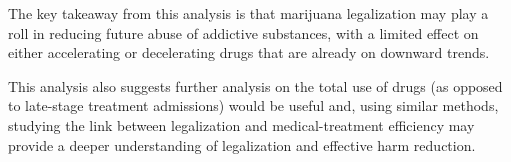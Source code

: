 \documentclass{article}
\begin{document}
The key takeaway from this analysis is that marijuana legalization may play a roll in reducing future abuse of addictive substances, with a limited effect on either accelerating or decelerating drugs that are already on downward trends.

This analysis also suggests further analysis on the total use of drugs (as opposed to late-stage treatment admissions) would be useful and, using similar methods, studying the link between legalization and medical-treatment efficiency may provide a deeper understanding of legalization and effective harm reduction.





\end{document}
